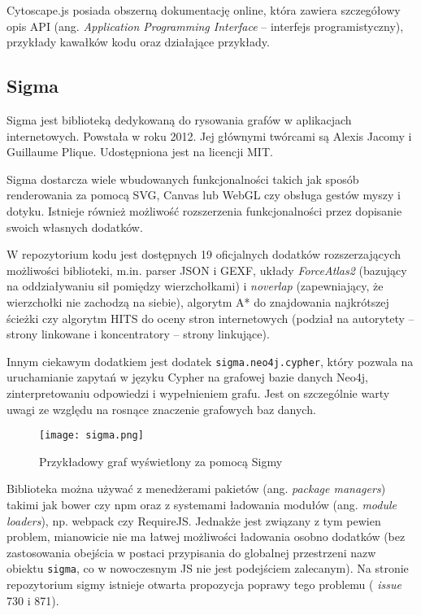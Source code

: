 Cytoscape.js posiada obszerną dokumentację online, która zawiera szczegółowy opis API (ang. \textit{Application Programming Interface} -- interfejs programistyczny), przykłady kawałków kodu oraz działające przykłady. 

\subsection{Sigma}

Sigma jest biblioteką dedykowaną do rysowania grafów w aplikacjach internetowych. Powstała w roku 2012. Jej głównymi twórcami są Alexis Jacomy i Guillaume Plique. Udostępniona jest na licencji MIT. 

Sigma dostarcza wiele wbudowanych funkcjonalności takich jak sposób renderowania za pomocą SVG, Canvas lub WebGL czy obsługa gestów myszy i dotyku. Istnieje również możliwość rozszerzenia funkcjonalności przez dopisanie swoich własnych dodatków. 

W repozytorium kodu jest dostępnych 19 oficjalnych dodatków rozszerzających możliwości biblioteki, m.in. parser JSON i GEXF, układy \textit{ForceAtlas2} (bazujący na oddziaływaniu sił pomiędzy wierzchołkami) i \textit{noverlap} (zapewniający, że wierzchołki nie zachodzą na siebie), algorytm A* do znajdowania najkrótszej ścieżki czy algorytm HITS do oceny stron internetowych (podział na autorytety -- strony linkowane i koncentratory -- strony linkujące). 

Innym ciekawym dodatkiem jest dodatek \texttt{sigma.neo4j.cypher}, który pozwala na uruchamianie zapytań w języku Cypher na grafowej bazie danych Neo4j, zinterpretowaniu odpowiedzi i wypełnieniem grafu. Jest on szczególnie warty uwagi ze względu na rosnące znaczenie grafowych baz danych. 

\bigskip

\begin{figure}[H]
\centering
\texttt{[image: sigma.png]}
\captionsetup{justification=centering}
\caption{Przykładowy graf wyświetlony za pomocą Sigmy}\label{fig:cytoscape}
\end{figure}

\bigskip

Biblioteka można używać z menedżerami pakietów (ang. \textit{package managers}) takimi jak bower czy npm oraz z systemami ładowania modułów (ang. \textit{module loaders}), np. webpack czy RequireJS. Jednakże jest związany z tym pewien problem, mianowicie nie ma łatwej możliwości ładowania osobno dodatków (bez zastosowania obejścia w postaci przypisania do globalnej przestrzeni nazw obiektu \texttt{sigma}, co w nowoczesnym JS nie jest podejściem zalecanym). Na stronie repozytorium sigmy istnieje otwarta propozycja poprawy tego problemu (\cite{sigma-repo} \textit{issue} 730 i 871).


